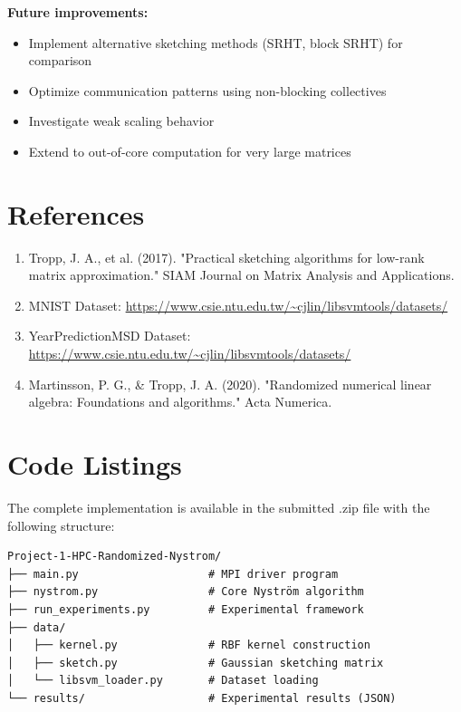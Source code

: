 \documentclass[11pt,a4paper]{article}
\begin{document}
\textbf{Future improvements:}
\begin{itemize}
    \item Implement alternative sketching methods (SRHT, block SRHT) for comparison
    \item Optimize communication patterns using non-blocking collectives
    \item Investigate weak scaling behavior
    \item Extend to out-of-core computation for very large matrices
\end{itemize}

\section*{References}

\begin{enumerate}
    \item Tropp, J. A., et al. (2017). "Practical sketching algorithms for low-rank matrix approximation." SIAM Journal on Matrix Analysis and Applications.
    \item MNIST Dataset: \url{https://www.csie.ntu.edu.tw/~cjlin/libsvmtools/datasets/}
    \item YearPredictionMSD Dataset: \url{https://www.csie.ntu.edu.tw/~cjlin/libsvmtools/datasets/}
    \item Martinsson, P. G., \& Tropp, J. A. (2020). "Randomized numerical linear algebra: Foundations and algorithms." Acta Numerica.
\end{enumerate}

\appendix

\section{Code Listings}

The complete implementation is available in the submitted .zip file with the following structure:

\begin{verbatim}
Project-1-HPC-Randomized-Nystrom/
├── main.py                    # MPI driver program
├── nystrom.py                 # Core Nyström algorithm
├── run_experiments.py         # Experimental framework
├── data/
│   ├── kernel.py              # RBF kernel construction
│   ├── sketch.py              # Gaussian sketching matrix
│   └── libsvm_loader.py       # Dataset loading
└── results/                   # Experimental results (JSON)
\end{verbatim}
\end{document}
